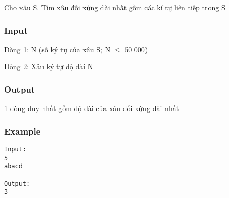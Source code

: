 



   Cho xâu S. Tìm xâu đối xứng dài nhất gồm các kí tự liên tiếp trong S  

\subsubsection{   Input  }

   Dòng 1: N (số ký tự của xâu S; N $\le$ 50 000)  

   Dòng 2: Xâu ký tự độ dài N  

\subsubsection{   Output  }

   1 dòng duy nhất gồm độ dài của xâu đối xứng dài nhất  

\subsubsection{   Example  }
\begin{verbatim}
Input:
5
abacd

Output:
3

\end{verbatim}
